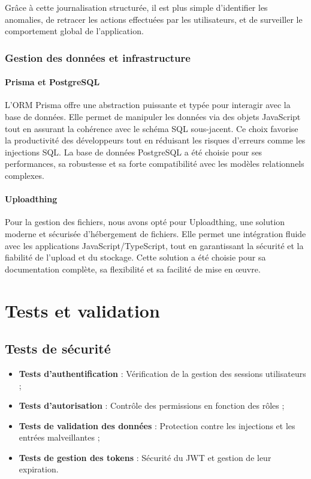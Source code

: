 Grâce à cette journalisation structurée, il est plus simple d’identifier les anomalies, de retracer les actions effectuées par les utilisateurs, et de surveiller le comportement global de l’application.

\subsubsection{Gestion des données et infrastructure}

\paragraph{Prisma et PostgreSQL}

L’ORM Prisma offre une abstraction puissante et typée pour interagir avec la base de données. Elle permet de manipuler les données via des objets JavaScript tout en assurant la cohérence avec le schéma SQL sous-jacent. Ce choix favorise la productivité des développeurs tout en réduisant les risques d'erreurs comme les injections SQL. La base de données PostgreSQL a été choisie pour ses performances, sa robustesse et sa forte compatibilité avec les modèles relationnels complexes.

\paragraph{Uploadthing}

Pour la gestion des fichiers, nous avons opté pour Uploadthing, une solution moderne et sécurisée d’hébergement de fichiers. Elle permet une intégration fluide avec les applications JavaScript/TypeScript, tout en garantissant la sécurité et la fiabilité de l’upload et du stockage. Cette solution a été choisie pour sa documentation complète, sa flexibilité et sa facilité de mise en œuvre.

\section{Tests et validation}
\subsection{Tests de sécurité}

\begin{itemize}
  \item \textbf{Tests d’authentification} : Vérification de la gestion des sessions utilisateurs ;
  \item \textbf{Tests d’autorisation} : Contrôle des permissions en fonction des rôles ;
  \item \textbf{Tests de validation des données} : Protection contre les injections et les entrées malveillantes ;
  \item \textbf{Tests de gestion des tokens} : Sécurité du JWT et gestion de leur expiration.
\end{itemize}

